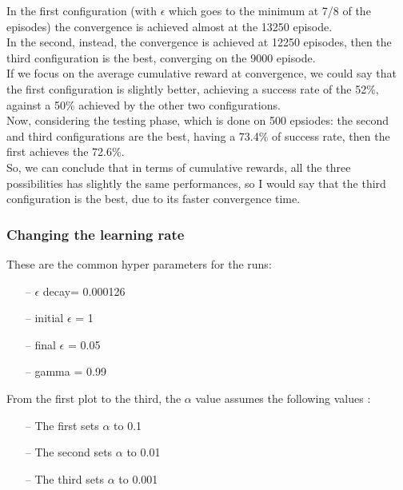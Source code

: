 \documentclass{article}
\begin{document}
In the first configuration (with $\epsilon$ which goes to the minimum at 7/8 of the episodes) the convergence is achieved almost at the 13250 episode.
\\
In the second, instead, the convergence is achieved at 12250 episodes, then the third configuration is the best, converging on the 9000 episode.
\\
If we focus on the average cumulative reward at convergence, we could say that the first configuration is slightly better, achieving a success rate of the 52\%, against a 50\% achieved by the other two configurations.
\\
Now, considering the testing phase, which is done on 500 epsiodes: the second and third configurations are the best, having a 73.4\% of success rate, then the first achieves the 72.6\%.
\\
So, we can conclude that in terms of cumulative rewards, all the three possibilities has slightly the same performances, so I would say that the third configuration is the best, due to its faster convergence time.


\subsubsection{Changing the learning rate}


These are the common hyper parameters for the runs:
\begin{itemize}
\item[--] $\epsilon$ decay= 0.000126
\item[--] initial $\epsilon$ = 1
\item[--] final $\epsilon$ = 0.05
\item[--] gamma = 0.99
\end{itemize}

From the first plot to the third, the $\alpha$ value assumes the following values :
\begin{itemize}
\item[--] The first sets $\alpha$ to 0.1
\item[--] The second sets $\alpha$ to 0.01
\item[--] The third sets $\alpha$ to 0.001
\end{itemize}

\clearpage


\begin{center}
\centering
{}
\end{center}
\end{document}
